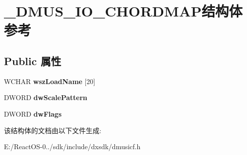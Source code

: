 \hypertarget{struct___d_m_u_s___i_o___c_h_o_r_d_m_a_p}{}\section{\+\_\+\+D\+M\+U\+S\+\_\+\+I\+O\+\_\+\+C\+H\+O\+R\+D\+M\+A\+P结构体 参考}
\label{struct___d_m_u_s___i_o___c_h_o_r_d_m_a_p}
\subsection*{Public 属性}
\begin{DoxyCompactItemize}
\item 
\mbox{\label{struct___d_m_u_s___i_o___c_h_o_r_d_m_a_p_acf37a5b62f85989702680ae617fd75df}} 
W\+C\+H\+AR {\bfseries wsz\+Load\+Name} \mbox{[}20\mbox{]}
\item 
\mbox{\label{struct___d_m_u_s___i_o___c_h_o_r_d_m_a_p_a4731f629f3008288d56c454dd183e599}} 
D\+W\+O\+RD {\bfseries dw\+Scale\+Pattern}
\item 
\mbox{\label{struct___d_m_u_s___i_o___c_h_o_r_d_m_a_p_abcd49fe46b2a1e470d39032a6ee6ba50}} 
D\+W\+O\+RD {\bfseries dw\+Flags}
\end{DoxyCompactItemize}


该结构体的文档由以下文件生成\+:\begin{DoxyCompactItemize}
\item 
E\+:/\+React\+O\+S-\/0../sdk/include/dxsdk/dmusicf.\+h\end{DoxyCompactItemize}
